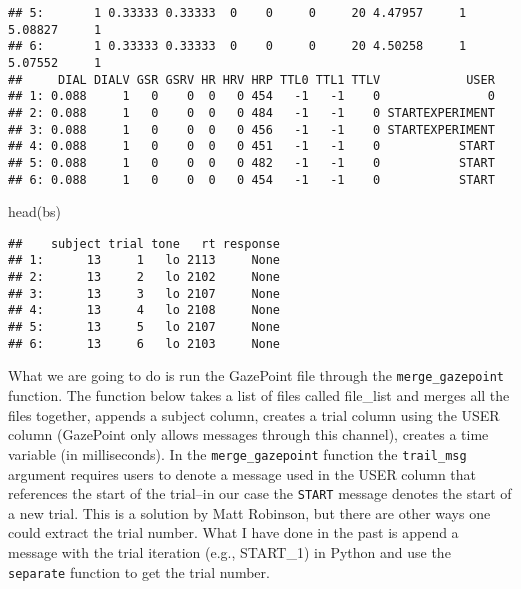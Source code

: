 \documentclass[
]{article}
\newenvironment{Shaded}{\begin{snugshade}}{\end{snugshade}}
\newcommand{\FunctionTok}[1]{\textcolor[rgb]{0.00,0.00,0.00}{#1}}
\newcommand{\NormalTok}[1]{#1}
\begin{document}
\begin{verbatim}
## 5:       1 0.33333 0.33333  0    0     0     20 4.47957     1 5.08827     1
## 6:       1 0.33333 0.33333  0    0     0     20 4.50258     1 5.07552     1
##     DIAL DIALV GSR GSRV HR HRV HRP TTL0 TTL1 TTLV            USER
## 1: 0.088     1   0    0  0   0 454   -1   -1    0               0
## 2: 0.088     1   0    0  0   0 484   -1   -1    0 STARTEXPERIMENT
## 3: 0.088     1   0    0  0   0 456   -1   -1    0 STARTEXPERIMENT
## 4: 0.088     1   0    0  0   0 451   -1   -1    0           START
## 5: 0.088     1   0    0  0   0 482   -1   -1    0           START
## 6: 0.088     1   0    0  0   0 454   -1   -1    0           START
\end{verbatim}

\begin{Shaded}
\begin{Highlighting}[]
\FunctionTok{head}\NormalTok{(bs)}
\end{Highlighting}
\end{Shaded}

\begin{verbatim}
##    subject trial tone   rt response
## 1:      13     1   lo 2113     None
## 2:      13     2   lo 2102     None
## 3:      13     3   lo 2107     None
## 4:      13     4   lo 2108     None
## 5:      13     5   lo 2107     None
## 6:      13     6   lo 2103     None
\end{verbatim}

What we are going to do is run the GazePoint file through the
\texttt{merge\_gazepoint} function. The function below takes a list of
files called file\_list and merges all the files together, appends a
subject column, creates a trial column using the USER column (GazePoint
only allows messages through this channel), creates a time variable (in
milliseconds). In the \texttt{merge\_gazepoint} function the
\texttt{trail\_msg} argument requires users to denote a message used in
the USER column that references the start of the trial--in our case the
\texttt{START} message denotes the start of a new trial. This is a
solution by Matt Robinson, but there are other ways one could extract
the trial number. What I have done in the past is append a message with
the trial iteration (e.g., START\_1) in Python and use the
\texttt{separate} function to get the trial number.
\end{document}
